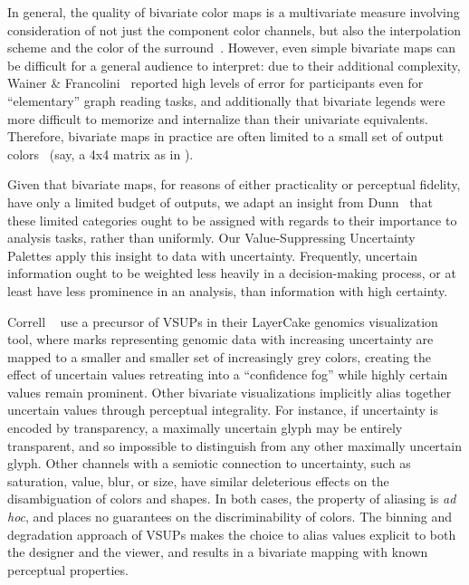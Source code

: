 In general, the quality of bivariate color maps is a multivariate measure involving consideration of not just the component color channels, but also the interpolation scheme and the color of the surround~\cite{bernard2015survey}. However, even simple bivariate maps can be difficult for a general audience to interpret: due to their additional complexity, Wainer \& Francolini~\cite{wainer1980empirical} reported high levels of error for participants even for ``elementary'' graph reading tasks, and additionally that bivariate legends were more difficult to memorize and internalize than their univariate equivalents. Therefore, bivariate maps in practice are often limited to a small set of output colors~\cite{robertson1986generation,trumbo1981theory} (say, a 4x4 matrix as in ).

Given that bivariate maps, for reasons of either practicality or perceptual fidelity, have only a limited budget of outputs, we adapt an insight from Dunn~\cite{dunn1989dynamic} that these limited categories ought to be assigned with regards to their importance to analysis tasks, rather than uniformly. Our Value-Suppressing Uncertainty Palettes apply this insight to data with uncertainty. Frequently, uncertain information ought to be weighted less heavily in a decision-making process, or at least have less prominence in an analysis, than information with high certainty.

Correll \ea~\cite{correll2015layercake,correll2011visualizing} use a precursor of VSUPs in their LayerCake genomics visualization tool, where marks representing genomic data with increasing uncertainty are mapped to a smaller and smaller set of increasingly grey colors, creating the effect of uncertain values retreating into a ``confidence fog'' while highly certain values remain prominent. Other bivariate visualizations implicitly alias together uncertain values through perceptual integrality. For instance, if uncertainty is encoded by transparency, a maximally uncertain glyph may be entirely transparent, and so impossible to distinguish from any other maximally uncertain glyph. Other channels with a semiotic connection to uncertainty, such as saturation, value, blur, or size, have similar deleterious effects on the disambiguation of colors and shapes. In both cases, the property of aliasing is \emph{ad hoc}, and places no guarantees on the discriminability of colors. The binning and degradation approach of VSUPs makes the choice to alias values explicit to both the designer and the viewer, and results in a bivariate mapping with known perceptual properties.

